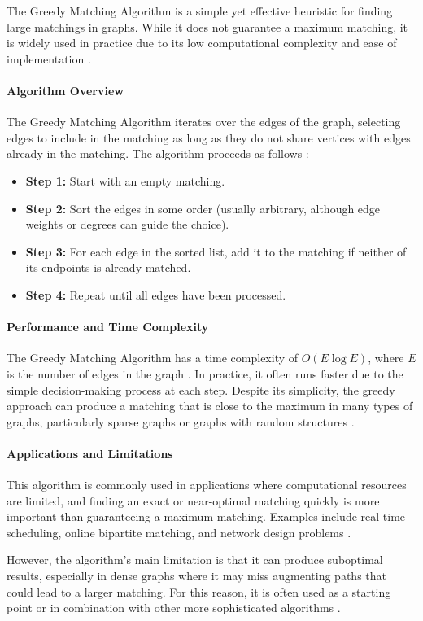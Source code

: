 The Greedy Matching Algorithm is a simple yet effective heuristic for finding large matchings in graphs. While it does not guarantee a maximum matching, it is widely used in practice due to its low computational complexity and ease of implementation \cite{pettie2004greedy}.

\paragraph{Algorithm Overview}
The Greedy Matching Algorithm iterates over the edges of the graph, selecting edges to include in the matching as long as they do not share vertices with edges already in the matching. The algorithm proceeds as follows \cite{avis1983greedy}:
\begin{itemize}
    \item \textbf{Step 1:} Start with an empty matching.
    \item \textbf{Step 2:} Sort the edges in some order (usually arbitrary, although edge weights or degrees can guide the choice).
    \item \textbf{Step 3:} For each edge in the sorted list, add it to the matching if neither of its endpoints is already matched.
    \item \textbf{Step 4:} Repeat until all edges have been processed.
\end{itemize}

\paragraph{Performance and Time Complexity}
The Greedy Matching Algorithm has a time complexity of \( O(E \log E) \), where \(E\) is the number of edges in the graph \cite{pettie2004greedy}. In practice, it often runs faster due to the simple decision-making process at each step. Despite its simplicity, the greedy approach can produce a matching that is close to the maximum in many types of graphs, particularly sparse graphs or graphs with random structures \cite{benson2018tutorial}.

\paragraph{Applications and Limitations}
This algorithm is commonly used in applications where computational resources are limited, and finding an exact or near-optimal matching quickly is more important than guaranteeing a maximum matching. Examples include real-time scheduling, online bipartite matching, and network design problems \cite{avis1983greedy}.

However, the algorithm’s main limitation is that it can produce suboptimal results, especially in dense graphs where it may miss augmenting paths that could lead to a larger matching. For this reason, it is often used as a starting point or in combination with other more sophisticated algorithms \cite{pettie2004greedy}.

